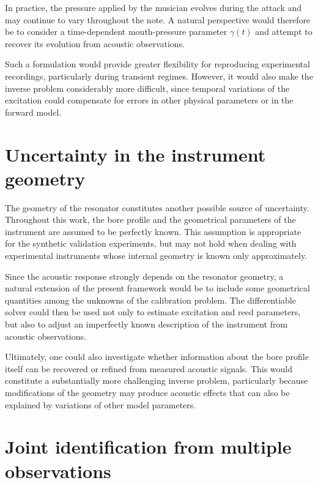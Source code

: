\documentclass[11pt,a4paper]{report}
\theoremstyle{plain}
\theoremstyle{definition}
\begin{document}
In practice, the pressure applied by the musician evolves during the attack
and may continue to vary throughout the note. A natural perspective would
therefore be to consider a time-dependent mouth-pressure parameter
$\gamma(t)$ and attempt to recover its evolution from acoustic observations.

Such a formulation would provide greater flexibility for reproducing
experimental recordings, particularly during transient regimes. However, it
would also make the inverse problem considerably more difficult, since temporal
variations of the excitation could compensate for errors in other physical
parameters or in the forward model.

\section{Uncertainty in the instrument geometry}

The geometry of the resonator constitutes another possible source of
uncertainty. Throughout this work, the bore profile and the geometrical
parameters of the instrument are assumed to be perfectly known. This assumption
is appropriate for the synthetic validation experiments, but may not hold when
dealing with experimental instruments whose internal geometry is known only
approximately.

Since the acoustic response strongly depends on the resonator geometry, a
natural extension of the present framework would be to include some geometrical
quantities among the unknowns of the calibration problem. The differentiable
solver could then be used not only to estimate excitation and reed parameters,
but also to adjust an imperfectly known description of the instrument from
acoustic observations.

Ultimately, one could also investigate whether information about the bore
profile itself can be recovered or refined from measured acoustic signals.
This would constitute a substantially more challenging inverse problem,
particularly because modifications of the geometry may produce acoustic effects
that can also be explained by variations of other model parameters.

\section{Joint identification from multiple observations}
\end{document}
